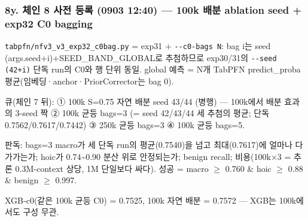 \subsubsection{8y. 체인 8 사전 등록 (0903 12:40) — 100k 배분 ablation seed +\allowbreak{} \textbf{exp32 C0 bagging}}
\par\noindent \textbullet\enspace \texttt{tabpfn/\allowbreak{}\allowbreak{}n\allowbreak{}fv3\_\allowbreak{}\allowbreak{}v3\_\allowbreak{}\allowbreak{}e\allowbreak{}xp32\_\allowbreak{}\allowbreak{}c0b\allowbreak{}ag.\allowbreak{}py} =\allowbreak{} exp31 +\allowbreak{} \texttt{-\allowbreak{}-\allowbreak{}c0-\allowbreak{}bag\allowbreak{}s N}: bag i는 seed (args.seed+\allowbreak{}i)+\allowbreak{}SEED\_\allowbreak{}BAND\_\allowbreak{}GLOBAL로 추첨하므로 exp30/\allowbreak{}31의 \texttt{-\allowbreak{}-\allowbreak{}seed (\allowbreak{}42+\allowbreak{}\allowbreak{}i)} 단독 run의 C0와 행 단위 동일. global 예측 =\allowbreak{} N개 TabPFN predict\_\allowbreak{}proba 평균(임베딩·anchor·PriorCorrector는 bag 0).


\par\noindent \textbullet\enspace 큐(체인 7 뒤): ① 100k S=\allowbreak{}0.75 자연 배분 seed 43/\allowbreak{}44 (병행) — 100k에서 배분 효과의 3-seed 짝 ② 100k 균등 bags=\allowbreak{}3 (=\allowbreak{} seed 42/\allowbreak{}43/\allowbreak{}44 세 추첨의 평균; 단독 0.7562/\allowbreak{}0.7617/\allowbreak{}0.7442) ③ 250k 균등 bags=\allowbreak{}3 ④ 100k 균등 bags=\allowbreak{}5.


\par\noindent \textbullet\enspace 판독: bags=\allowbreak{}3 macro가 세 단독 run의 평균(0.7540)을 넘고 최대(0.7617)에 얼마나 다가가는가; hoic가 0.74\textasciitilde{}0.90 분산 위로 안정되는가; benign recall; 비용(100k×3 =\allowbreak{} 추론 0.3M-context 상당, 1M 단일보다 싸다). 성공 =\allowbreak{} macro \ensuremath{\geq} 0.760 \& hoic \ensuremath{\geq} 0.88 \& benign \ensuremath{\geq} 0.997.


\par\noindent \textbullet\enspace XGB-c0(같은 100k 균등 C0) =\allowbreak{} 0.7525, 100k 자연 배분 =\allowbreak{} 0.7572 — XGB는 100k에서도 구성 무관.


